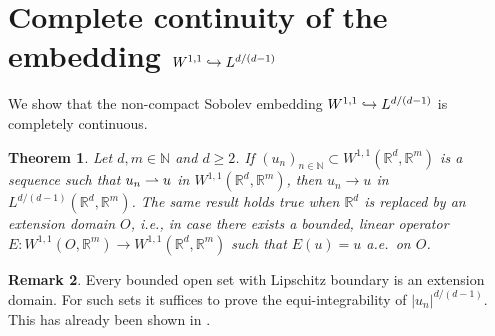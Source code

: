 \documentclass[11pt]{article}
\newcommand{\ie}{i.e.,\xspace}
\numberwithin{equation}{section}
\def\hto{\mathrel{\lhook\joinrel\to}}
\def\harptod{\mathrel{\relbar\joinrel\rightharpoonup}}
\def\harpto{\mathchoice{\harptod}{\rightharpoonup}{\rightharpoonup}{\rightharpoonup}}
\newtheorem{theorem}{Theorem}[section]
\theoremstyle{definition}
\newtheorem{remark}[theorem]{Remark}
\newcommand{\R}{\mathbb{R}}
\newcommand{\N}{\mathbb{N}}
\begin{document}
\section{Complete continuity of the embedding \texorpdfstring{$W^{1,1}\hto L^{d/(d-1)}$}{}}\label{app:1}
We show that the non-compact Sobolev embedding $W^{1,1}\hto L^{d/(d-1)}$ is completely continuous.
\begin{theorem}\label{thm.embedding}
Let $d,m\in\N$ and $d\geq 2$. If $(u_n)_{n\in\N}\subset W^{1,1}(\R^d,\R^m)$ is a sequence such that $u_n\harpto u$ in $W^{1,1}(\R^d,\R^m)$, then $u_n\to u$ in $L^{d/(d-1)}(\R^d,\R^m)$. The same result holds true when $\R^d$ is replaced by an extension domain $O$, \ie in case there exists a bounded, linear operator $E:W^{1,1}(O,\R^m)\to W^{1,1}(\R^d,\R^m)$ such that $E(u)=u$ a.e.\ on $O$.
\end{theorem}
\begin{remark}
Every bounded open set with Lipschitz boundary is an extension domain. For such sets it suffices to prove the equi-integrability of $|u_n|^{d/(d-1)}$. This has already been shown in \cite[Lem.\,A.3]{DLFS}.
\end{remark}
\end{document}
